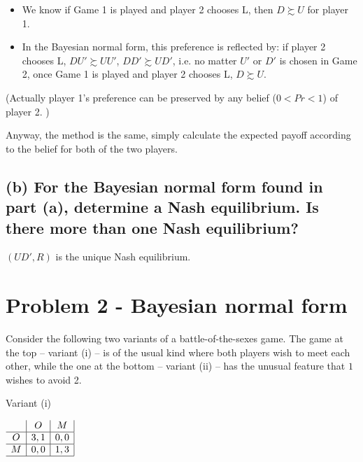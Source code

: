 \documentclass{article}
\begin{document}
\begin{mdframed}[backgroundcolor=blue!20,linecolor=white]
\begin{itemize}
\begin{itemize}
\item We know if Game 1 is played and player 2 chooses L, then $D \succsim U$ for player 1.
\item In the Bayesian normal form, this preference is reflected by: if player 2 chooses L, $DU' \succsim UU'$, $DD' \succsim UD'$, i.e. no matter $U'$ or $D'$ is chosen in Game 2, once Game 1 is played and player 2 chooses L,  $D \succsim U$.
\end{itemize}
(Actually player 1's  preference can be preserved by any belief ($0<Pr<1$) of player 2. )

\end{itemize}

Anyway, the method is the same, simply calculate the expected payoff according to the belief for both of the two players.
\end{mdframed}



\subsection*{(b) For the Bayesian normal form found in part (a), determine a Nash equilibrium. Is there more than one Nash equilibrium?}

$(UD',R)$ is the unique Nash equilibrium.


\section{Problem 2 - Bayesian normal form}

Consider the following two variants of a battle-of-the-sexes game. The game at the top --
variant (i) -- is of the usual kind where both players wish to meet each other, while the one
at the bottom -- variant (ii) -- has the unusual feature that $1$ wishes to avoid 2.\vspace{-6pt}

\begin{center}
Variant (i) \vspace{6pt}

$
\begin{array}{c|c|c|}
 & O & M \\
\hline
O & 3,1 & 0,0 \\
\hline
M & 0,0 & 1,3 \\
\hline
\end{array}
$
\end{center}
\end{document}
